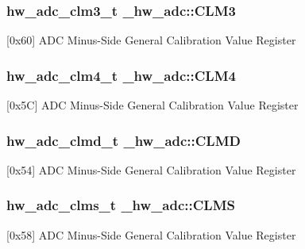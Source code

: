 \subsubsection[{\texorpdfstring{C\+L\+M3}{CLM3}}]{ {\bf hw\+\_\+adc\+\_\+clm3\+\_\+t} \+\_\+hw\+\_\+adc\+::\+C\+L\+M3}\hypertarget{struct__hw__adc_a57e632a8e8752ae4f1ecb894a91dd36e}{}\label{struct__hw__adc_a57e632a8e8752ae4f1ecb894a91dd36e}
\mbox{[}0x60\mbox{]} A\+DC Minus-\/\+Side General Calibration Value Register 
\subsubsection[{\texorpdfstring{C\+L\+M4}{CLM4}}]{ {\bf hw\+\_\+adc\+\_\+clm4\+\_\+t} \+\_\+hw\+\_\+adc\+::\+C\+L\+M4}\hypertarget{struct__hw__adc_a19a939ee1f1317b94a5d8fcda77c336f}{}\label{struct__hw__adc_a19a939ee1f1317b94a5d8fcda77c336f}
\mbox{[}0x5C\mbox{]} A\+DC Minus-\/\+Side General Calibration Value Register 
\subsubsection[{\texorpdfstring{C\+L\+MD}{CLMD}}]{ {\bf hw\+\_\+adc\+\_\+clmd\+\_\+t} \+\_\+hw\+\_\+adc\+::\+C\+L\+MD}\hypertarget{struct__hw__adc_a29eae2b2e05ea54c1a231548ecbcbcb4}{}\label{struct__hw__adc_a29eae2b2e05ea54c1a231548ecbcbcb4}
\mbox{[}0x54\mbox{]} A\+DC Minus-\/\+Side General Calibration Value Register 
\subsubsection[{\texorpdfstring{C\+L\+MS}{CLMS}}]{ {\bf hw\+\_\+adc\+\_\+clms\+\_\+t} \+\_\+hw\+\_\+adc\+::\+C\+L\+MS}\hypertarget{struct__hw__adc_ac9196e46d2b22fd8fa82c93406aaaf71}{}\label{struct__hw__adc_ac9196e46d2b22fd8fa82c93406aaaf71}
\mbox{[}0x58\mbox{]} A\+DC Minus-\/\+Side General Calibration Value Register 
